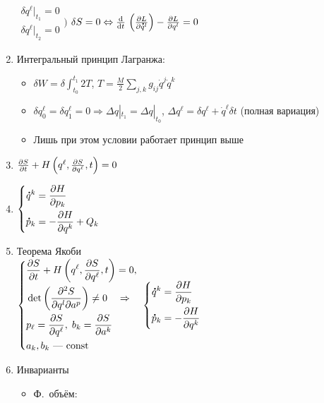 \documentclass[final,landscape,hardcopy]{notes}
\begin{document}
\begin{multicols*}{4}
\begin{enumerate}
      $
      \begin{aligned}
        \delta q^\ell |_{t_1} = 0 \\ \delta q^\ell |_{t_2} = 0 
      \end{aligned}
    \Bigg)
    $
    $\delta S = 0 \Leftrightarrow \fder{}{t}\, \left(\pder{L}{\dot q^l}\right) - \pder{L}{q^l} = 0$
  \item Интегральный принцип Лагранжа:
    \begin{itemize}
      \item $\delta W = \delta \int_{t_0}^{t_1} 2 T$, 
        $T = \tfrac{M}{2} \sum_{j,k} g_{ij} \dot q^j \dot q^k$
      \item $\delta q_0^\ell = \delta q_1^\ell = 0 \Rightarrow \Delta q|_{t_1} = \Delta q |_{t_0}$,
        $\Delta q^\ell = \delta q^\ell + \dot q^\ell \delta t$ (полная вариация)
      \item Лишь при этом условии работает принцип выше
    \end{itemize}
  \item $\frac{\partial S}{\partial t} + H\left(q^\ell ,\frac{\partial S}{\partial q^\ell}, t\right) = 0$
  \item $
    \left\{
      \begin{aligned}
        \label{eq:hamilt}
        \accentset{\mbox{\bfseries .}}{q}^k &= \frac{\partial H}{\partial p_k} \\
        \accentset{\mbox{\bfseries .}}{p}_k &= - \frac{\partial H}{\partial q^k} + Q_k
      \end{aligned}
    \right.
    $
  \item Теорема Якоби \\
    \hspace{-1.2em}$ 
    \left\{
      \begin{aligned}
        \label{eq:jacobth}
        &\frac{\partial S}{\partial t} + H\left(q^\ell ,\frac{\partial S}{\partial q^\ell}, t\right)= 0, \\
        &\det\left(\frac{\partial^2 S}{\partial q^l \partial a^p}\right) \neq 0\quad\Rightarrow~\\ 
        &p_\ell = \frac{\partial S}{\partial q^\ell}, \; b_k = \frac{\partial S}{\partial a^k}\\
        &a_k, b_k \text{~--- const}
      \end{aligned}
    \right.~
    \left\{
      \begin{aligned}
        \label{eq:hamilt}
        \accentset{\mbox{\bfseries .}}{q}^k &= \frac{\partial H}{\partial p_k} \\
        \accentset{\mbox{\bfseries .}}{p}_k &= - \frac{\partial H}{\partial q^k}
      \end{aligned}
    \right.
    $
  \item Инварианты
    \begin{itemize}
      \item Ф.~объём:

\end{itemize}
\end{enumerate}
\end{multicols*}
\end{document}
